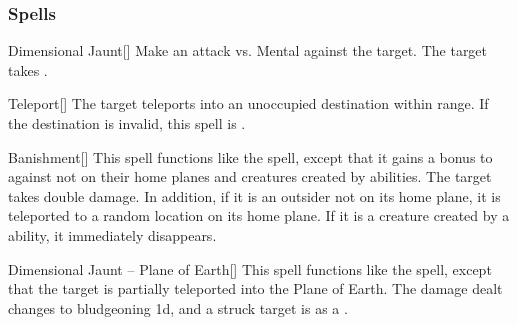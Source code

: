 \subsubsection{Spells}


\lowercase{\hypertarget{spell:Dimensional Jaunt}{}}\label{spell:Dimensional Jaunt}
\begin{freeability}[Rank 1]{\hypertarget{spell:Dimensional Jaunt}{Dimensional Jaunt}}[]
Make an attack vs. Mental against the target.
\hit The target takes .
\end{freeability}
\vspace{0.25em}



\lowercase{\hypertarget{spell:Teleport}{}}\label{spell:Teleport}
\begin{freeability}[Rank 1]{\hypertarget{spell:Teleport}{Teleport}}[]
The target teleports into an unoccupied destination within range.
If the destination is invalid, this spell is .
\end{freeability}
\vspace{0.25em}



\lowercase{\hypertarget{spell:Banishment}{}}\label{spell:Banishment}
\begin{freeability}[Rank 3]{\hypertarget{spell:Banishment}{Banishment}}[]
This spell functions like the  spell, except that it gains a  bonus to  against  not on their home planes and creatures created by  abilities.
\crit The target takes double damage.
In addition, if it is an outsider not on its home plane, it is teleported to a random location on its home plane.
If it is a creature created by a  ability, it immediately disappears.
\end{freeability}
\vspace{0.25em}



\lowercase{\hypertarget{spell:Dimensional Jaunt -- Plane of Earth}{}}\label{spell:Dimensional Jaunt -- Plane of Earth}
\begin{freeability}[Rank 3]{\hypertarget{spell:Dimensional Jaunt -- Plane of Earth}{Dimensional Jaunt -- Plane of Earth}}[]
This spell functions like the  spell, except that the target is partially teleported into the Plane of Earth.
The damage dealt changes to bludgeoning  \minus1d, and a struck target is  as a .
\end{freeability}
\vspace{0.25em}



